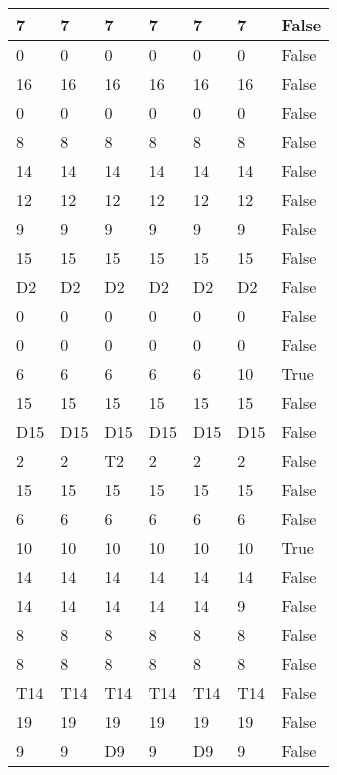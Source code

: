 \begin{longtable}[htbp]{| p{} | p{} | p{}| p{}| p{}| p{}| p{}|}
7 & 7 & 7 & 7 & 7 & 7 & False \\ \hline
0 & 0 & 0 & 0 & 0 & 0 & False \\ \hline
16 & 16 & 16 & 16 & 16 & 16 & False \\ \hline
0 & 0 & 0 & 0 & 0 & 0 & False \\ \hline
8 & 8 & 8 & 8 & 8 & 8 & False \\ \hline
14 & 14 & 14 & 14 & 14 & 14 & False \\ \hline
12 & 12 & 12 & 12 & 12 & 12 & False \\ \hline
9 & 9 & 9 & 9 & 9 & 9 & False \\ \hline
15 & 15 & 15 & 15 & 15 & 15 & False \\ \hline
\multicolumn{1}{|l|}{D2} & \multicolumn{1}{l|}{D2} & \multicolumn{1}{l|}{D2} & \multicolumn{1}{l|}{D2} & \multicolumn{1}{l|}{D2} & \multicolumn{1}{l|}{D2} & False \\ \hline
0 & 0 & 0 & 0 & 0 & 0 & False \\ \hline
0 & 0 & 0 & 0 & 0 & 0 & False \\ \hline
6 & 6 & 6 & 6 & 6 & 10 & True \\ \hline
15 & 15 & 15 & 15 & 15 & 15 & False \\ \hline
\multicolumn{1}{|l|}{D15} & \multicolumn{1}{l|}{D15} & \multicolumn{1}{l|}{D15} & \multicolumn{1}{l|}{D15} & \multicolumn{1}{l|}{D15} & \multicolumn{1}{l|}{D15} & False \\ \hline
2 & 2 & \multicolumn{1}{l|}{T2} & 2 & 2 & 2 & False \\ \hline
15 & 15 & 15 & 15 & 15 & 15 & False \\ \hline
6 & 6 & 6 & 6 & 6 & 6 & False \\ \hline
10 & 10 & 10 & 10 & 10 & 10 & True \\ \hline
14 & 14 & 14 & 14 & 14 & 14 & False \\ \hline
14 & 14 & 14 & 14 & 14 & 9 & False \\ \hline
8 & 8 & 8 & 8 & 8 & 8 & False \\ \hline
8 & 8 & 8 & 8 & 8 & 8 & False \\ \hline
\multicolumn{1}{|l|}{T14} & \multicolumn{1}{l|}{T14} & \multicolumn{1}{l|}{T14} & \multicolumn{1}{l|}{T14} & \multicolumn{1}{l|}{T14} & \multicolumn{1}{l|}{T14} & False \\ \hline
19 & 19 & 19 & 19 & 19 & 19 & False \\ \hline
9 & 9 & \multicolumn{1}{l|}{D9} & 9 & \multicolumn{1}{l|}{D9} & 9 & False \\ \hline

\end{longtable}
